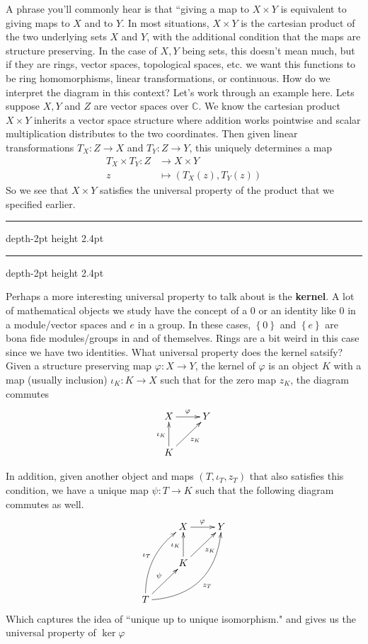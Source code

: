 \documentclass[psamsfonts]{amsart}
\theoremstyle{definition}
\theoremstyle{remark}
\newcommand{\C}{\mathbb{C}}
\newcommand{\set}[1]{\left\lbrace#1 \right\rbrace}
\newcommand*\myhrulefill{%
   \leavevmode\leaders\hrule depth-2pt height 2.4pt\hfill\kern0pt}
\newcommand\niceending[1]{%
  \begin{center}%
    \LARGE \myhrulefill \hspace{0.2cm} #1 \hspace{0.2cm} \myhrulefill%
  \end{center}}
\newcommand*\subsectionend{\niceending{\decosix}}
\begin{document}
A phrase you'll commonly hear is that ``giving a map to $X \times Y$ is equivalent to giving maps to $X$ and to $Y$. In most situations, $X \times Y$ is the cartesian product of the two underlying sets $X$ and $Y$, with the additional condition that the maps are structure preserving. In the case of $X,Y$ being sets, this doesn't mean much, but if they are rings, vector spaces, topological spaces, etc. we want this functions to be ring homomorphisms, linear transformations, or continuous. How do we interpret the diagram in this context? Let's work through an example here. Lets suppose $X,Y$ and $Z$ are vector spaces over $\C$. We know the cartesian product $X \times Y$ inherits a vector space structure where addition works pointwise and scalar multiplication distributes to the two coordinates. Then given linear transformations $T_X: Z \to X$ and $T_Y: Z \to Y$, this uniquely determines a map
\begin{align*}
T_X \times T_Y: Z &\to X\times Y \\
z &\mapsto (T_X(z), T_Y(z))
\end{align*}
So we see that $X \times Y$ satisfies the universal property of the product that we specified earlier. 
\subsectionend
Perhaps a more interesting universal property to talk about is the \textbf{kernel}. A lot of mathematical objects we study have the concept of a $0$ or an identity like $0$ in a module/vector spaces and $e$ in a group. In these cases, $\set{0}$ and $\set{e}$ are bona fide modules/groups in and of themselves. Rings are a bit weird in this case since we have two identities. What universal property does the kernel satsify? Given a  structure preserving map $\varphi : X \to Y$, the kernel of $\varphi$ is an object $K$ with a map (usually inclusion) $\iota_K : K \to X$ such that for the zero map $z_K$, the diagram commutes 
\begin{align*}
\xymatrix{
 X \ar[r]^\varphi & Y \\
 K \ar[u]^{\iota_K} \ar[ur]_{z_K}
}
\end{align*}

In addition, given another object and maps $(T,\iota_T, z_T)$ that also satisfies this condition, we have a unique map $\psi: T \to K$ such that the following diagram commutes as well.
\begin{align*}
\xymatrix{
& X \ar[r]^\varphi & Y \\
& K \ar[u]^{\iota_K} \ar[ur]_{z_K} \\
T \ar[ur]^\psi \ar@/^1pc/[uur]^{\iota_T} \ar@/_2pc/[uurr]_{z_T}
}
\end{align*}
Which captures the idea of ``unique up to unique isomorphism." and gives us the universal property of $\ker \varphi$\\
\end{document}
